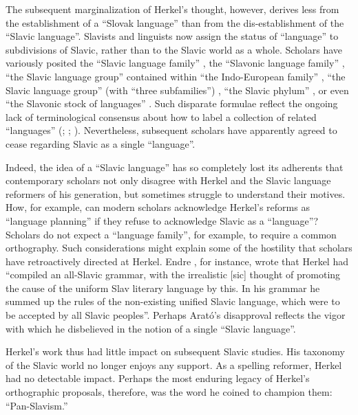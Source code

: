 The subsequent marginalization of Herkel’s thought, however, derives less from the establishment of a “Slovak language” than from the dis-establishment of the “Slavic language”. Slavists and linguists now assign the status of “language” to subdivisions of Slavic, rather than to the Slavic world as a whole. Scholars have variously posited the “Slavic language family” \citep[99]{milewski_introduction_1973}, the “Slavonic language family” \citep[5, see also 3]{corbett_introduction_1993}, “the Slavic language group” contained within “the Indo-European family” \citep[76]{lipson_russian_1981}, “the Slavic language group” (with “three subfamilies”) \citep[415]{brown_slavic_2006}, “the Slavic phylum” \citep[77]{stolz_chapter_2009}, or even “the Slavonic stock of languages” \citep[73]{fowler_english_1859}. Such disparate formulae reflect the ongoing lack of terminological consensus about how to label a collection of related “languages” (\cite[321]{swadesh_perspectives_1954}; \cite[153]{wurm_new_1975}; \cite[391]{mcgregor_linguistics_2015}). Nevertheless, subsequent scholars have apparently agreed to cease regarding Slavic as a single “language”.

Indeed, the idea of a “Slavic language” has so completely lost its adherents that contemporary scholars not only disagree with Herkel and the Slavic language reformers of his generation, but sometimes struggle to understand their motives. How, for example, can modern scholars acknowledge Herkel’s reforms as “language planning” if they refuse to acknowledge Slavic as a “language”? Scholars do not expect a “language family”, for example, to require a common orthography. Such considerations might explain some of the hostility that scholars have retroactively directed at Herkel. Endre \citet[76]{arato_slavic_1976}, for instance, wrote that Herkel had “compiled an all-Slavic grammar, with the irrealistic [sic] thought of promoting the cause of the uniform Slav literary language by this. In his grammar he summed up the rules of the non-existing unified Slavic language, which were to be accepted by all Slavic peoples”. Perhaps Arató’s disapproval reflects the vigor with which he disbelieved in the notion of a single “Slavic language”.

Herkel’s work thus had little impact on subsequent Slavic studies. His taxonomy of the Slavic world no longer enjoys any support. As a spelling reformer, Herkel had no detectable impact. Perhaps the most enduring legacy of Herkel’s orthographic proposals, therefore, was the word he coined to champion them: “Pan-Slavism.”

